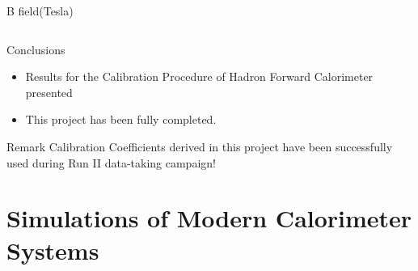 \documentclass[pdf, 9pt]{beamer}
\begin{document}
\begin{frame}
\begin{columns}[T]
\begin{column}{0.5\textwidth}
\begin{center}
        \end{center}
        \begin{flushright}
          B field(Tesla)
        \end{flushright}
      \end{column}
    \end{columns}
  \end{frame}

  \begin{frame}{Conclusions}
    \begin{itemize}
      \item Results for the Calibration Procedure of Hadron Forward Calorimeter presented
      \item This project has been fully completed.
    \end{itemize}
    \begin{block}{Remark}
    \alert{Calibration Coefficients derived in this project have been successfully used during Run II data-taking campaign!}
    \end{block}
  \end{frame}

%
%
\section{Simulations of Modern Calorimeter Systems}

{ %
    \begin{frame}[plain]
     \end{frame}
}
\end{document}
